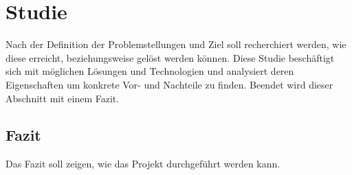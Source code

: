 \chapter{Studie}
Nach der Definition der Problemstellungen und Ziel soll recherchiert werden, wie diese erreicht, beziehungsweise gelöst werden können. Diese Studie beschäftigt sich mit möglichen Lösungen und Technologien und analysiert deren Eigenschaften um konkrete Vor- und Nachteile zu finden.
Beendet wird dieser Abschnitt mit einem Fazit.

\section{Fazit}
Das Fazit soll zeigen, wie das Projekt durchgeführt werden kann.

